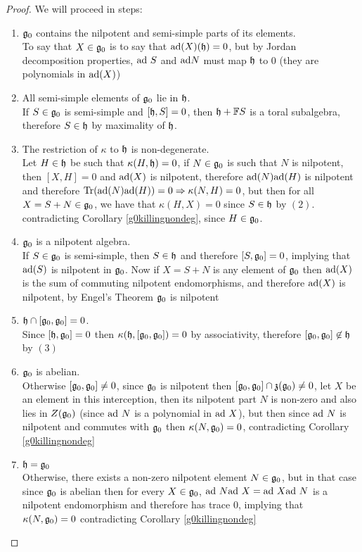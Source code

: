 \begin{proof}
	We will proceed in steps:
	\begin{enumerate}
		\item $\mathfrak{g}_0$ contains the nilpotent and semi-simple parts of its elements.\\
		To say that $X \in \mathfrak{g}_0$ is to say that $\text{ad}(X)(\mathfrak{h})=0$, but by Jordan decomposition properties, $\text{ad} \ S$ and $\text{ad} N$ must map $\mathfrak{h}$ to $0$ (they are polynomials in $\text{ad}(X)$)
		\item All semi-simple elements of $\mathfrak{g}_0$ lie in $\mathfrak{h}$.\\
		If $S \in \mathfrak{g}_0$ is semi-simple and $[\mathfrak{h},S]=0$, then $\mathfrak{h}+\mathbb{F} S$ is a toral subalgebra, therefore $S \in \mathfrak{h}$ by maximality of $\mathfrak{h}$.
		\item The restriction of $\kappa$ to $\mathfrak{h}$ is non-degenerate.\\
		Let $H \in \mathfrak{h}$ be such that $\kappa(H,\mathfrak{h})=0$, if $N \in \mathfrak{g}_0$ is such that $N$ is nilpotent, then $[X,H]=0$ and $\text{ad}(X)$ is nilpotent, therefore $\text{ad}(N)\text{ad}(H)$ is nilpotent and therefore $\text{Tr}(\text{ad}(N)\text{ad}(H))=0 \Rightarrow \kappa(N,H)=0$, but then for all $X=S+N \in \mathfrak{g}_0$, we have that $\kappa(H,X)=0$ since $S \in \mathfrak{h}$ by $(2)$. contradicting Corollary \ref{g0killingnondeg}, since $H \in \mathfrak{g}_0$.
		\item $\mathfrak{g}_0$ is a nilpotent algebra. \\
		If $S \in \mathfrak{g}_0$ is semi-simple, then $S \in \mathfrak{h}$ and therefore $[S,\mathfrak{g}_0]=0$, implying that $\text{ad}(S)$ is nilpotent in $\mathfrak{g}_0$. Now if $X=S+N$ is any element of $\mathfrak{g}_0$ then $\text{ad}(X)$ is the sum of commuting nilpotent endomorphisms, and therefore $\text{ad}(X)$ is nilpotent, by Engel's Theorem $\mathfrak{g}_0$ is nilpotent
		\item $\mathfrak{h} \cap [\mathfrak{g}_0,\mathfrak{g}_0]=0$.\\
		Since $[\mathfrak{h},\mathfrak{g}_0]=0$ then $\kappa(\mathfrak{h},[\mathfrak{g}_0,\mathfrak{g}_0]) =0$ by associativity, therefore $[\mathfrak{g}_0,\mathfrak{g}_0]\not \in \mathfrak{h}$ by $(3)$
		\item $\mathfrak{g}_0$ is abelian.\\
		Otherwise $[\mathfrak{g}_0,\mathfrak{g}_0]\not=0$, since $\mathfrak{g}_0$ is nilpotent then $[\mathfrak{g}_0,\mathfrak{g}_0]\cap\mathfrak{z}(\mathfrak{g}_0)\not=0$, let $X$ be an element in this interception, then its nilpotent part $N$ is non-zero and also lies in $Z(\mathfrak{g}_0)$ (since $\text{ad}\ N$ is a polynomial in $\text{ad} \ X$), but then since $\text{ad} \ N$ is nilpotent and commutes with $\mathfrak{g}_0$ then $\kappa(N,\mathfrak{g}_0)=0$, contradicting Corollary \ref{g0killingnondeg}
		\item $\mathfrak{h}=\mathfrak{g}_0$\\
		Otherwise, there exists a non-zero nilpotent element $N \in \mathfrak{g}_0$, but in that case since $\mathfrak{g}_0$ is abelian then for every $X \in \mathfrak{g}_0$, $\text{ad} \ N \text{ad} \ X = \text{ad} \ X \text{ad} \ N$ is a nilpotent endomorphism and therefore has trace $0$, implying that $\kappa(N,\mathfrak{g}_0)=0$ contradicting Corollary \ref{g0killingnondeg}
	\end{enumerate}
\end{proof}